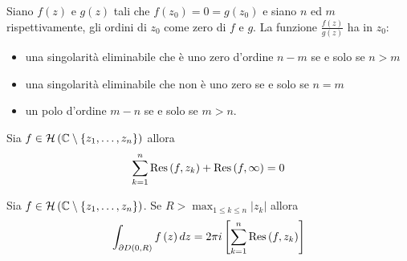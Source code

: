 \begin{thm}
Siano $f(z)$ e $g(z)$ tali che $f\left(z_{0}\right) = 0 = g\left(z_{0}\right)$ e siano $n$ ed $m$ rispettivamente, gli ordini di $z_{0}$ come zero di $f$ e $g$. La funzione $\frac{f(z)}{g(z)}$ ha in $z_{0}$:

\begin{itemize}
\item una singolarità eliminabile che è uno zero d'ordine $n - m$ se e solo se $n > m$
\item una singolarità eliminabile che non è uno zero se e solo se $n = m$
\item un polo d'ordine $m - n$ se e solo se $m > n$.
\end{itemize}
\end{thm}
\begin{thm}
Sia $f\in \mathcal{H} \left(\mathbb{C}  \setminus \left\{z_{1}, \dotsc, z_{n}\right\}\right)$ allora
\begin{equation*}
\sum\limits^{n}_{k = 1}\operatorname{Res} \left(f, z_{k}\right) + \operatorname{Res} \left(f, \infty \right) = 0
\end{equation*}
\end{thm}
\begin{thm}
Sia $f\in \mathcal{H} \left(\mathbb{C}  \setminus \left\{z_{1}, \dotsc, z_{n}\right\}\right)$. Se $R > \max_{1 \leq k \leq n}\left| z_{k}\right| $ allora
\begin{equation*}
\int\nolimits_{\partial D\left(0, R\right)} f\left(z\right) dz = 2\pi i\left[\sum\limits^{n}_{k = 1}\operatorname{Res} \left(f, z_{k}\right)\right]
\end{equation*}
\end{thm}
